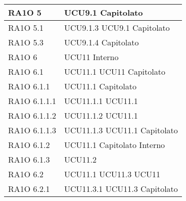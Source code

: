 \begin{center}
\begin{longtable}{ | p{5cm} | p{5cm} |}
        RA1O 5  &  UCU9.1 \newline  Capitolato \newline  \\ \hline      
        RA1O 5.1 &  UCU9.1.3 \newline  UCU9.1 \newline  Capitolato \newline  \\ \hline      
        RA1O 5.3 &  UCU9.1.4 \newline  Capitolato \newline  \\ \hline      
        RA1O 6 &  UCU11 \newline  Interno \newline  \\ \hline      
        RA1O 6.1  &  UCU11.1 \newline  UCU11 \newline  Capitolato \newline  \\ \hline      
        RA1O 6.1.1  &  UCU11.1 \newline  Capitolato \newline  \\ \hline      
        RA1O 6.1.1.1  &  UCU11.1.1 \newline  UCU11.1 \newline  \\ \hline      
        RA1O 6.1.1.2 &  UCU11.1.2 \newline  UCU11.1 \newline  \\ \hline      
        RA1O 6.1.1.3  &  UCU11.1.3 \newline  UCU11.1 \newline  Capitolato \newline  \\ \hline      
        RA1O 6.1.2  &  UCU11.1 \newline  Capitolato \newline  Interno \newline  \\ \hline      
        RA1O 6.1.3  &  UCU11.2 \newline  \\ \hline      
        RA1O 6.2  &  UCU11.1 \newline  UCU11.3 \newline  UCU11 \newline  \\ \hline      
        RA1O 6.2.1 &  UCU11.3.1 \newline  UCU11.3 \newline  Capitolato \newline  \\ \hline      

\end{longtable}
\end{center}
